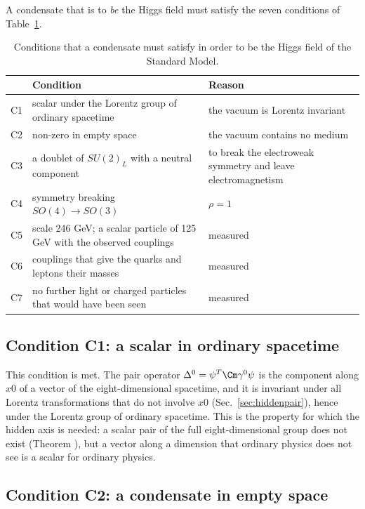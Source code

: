 A condensate that is to \emph{be} the Higgs field must satisfy the seven conditions of
Table~\ref{tab:conditions}.

\begin{table}
\caption{\label{tab:conditions}Conditions that a condensate must satisfy in order to be the Higgs
field of the Standard Model.}
\begin{ruledtabular}
\begin{tabular}{l>{\raggedright\arraybackslash}p{}>{\raggedright\arraybackslash}p{}}
 & Condition & Reason \\
\hline
C1 & scalar under the Lorentz group of ordinary spacetime & the vacuum is Lorentz invariant \\
C2 & non-zero in empty space & the vacuum contains no medium \\
C3 & a doublet of $SU(2)_L$ with a neutral component & to break the electroweak symmetry and leave electromagnetism \\
C4 & symmetry breaking $SO(4)\to SO(3)$ & $\rho=1$ \\
C5 & scale 246 GeV; a scalar particle of 125 GeV with the observed couplings & measured \\
C6 & couplings that give the quarks and leptons their masses & measured \\
C7 & no further light or charged particles that would have been seen & measured \\
\end{tabular}
\end{ruledtabular}
\end{table}

\subsection{Condition C1: a scalar in ordinary spacetime}

This condition is met. The pair operator $\Delta^0=\psi^T\Cm\gamma^0\psi$ is the component along $x0$
of a vector of the eight-dimensional spacetime, and it is invariant under all Lorentz transformations
that do not involve $x0$ (Sec.~\ref{sec:hiddenpair}), hence under the Lorentz group of ordinary
spacetime. This is the property for which the hidden axis is needed: a scalar pair of the full
eight-dimensional group does not exist (Theorem ), but a vector along a dimension that
ordinary physics does not see is a scalar for ordinary physics.

\subsection{Condition C2: a condensate in empty space}

